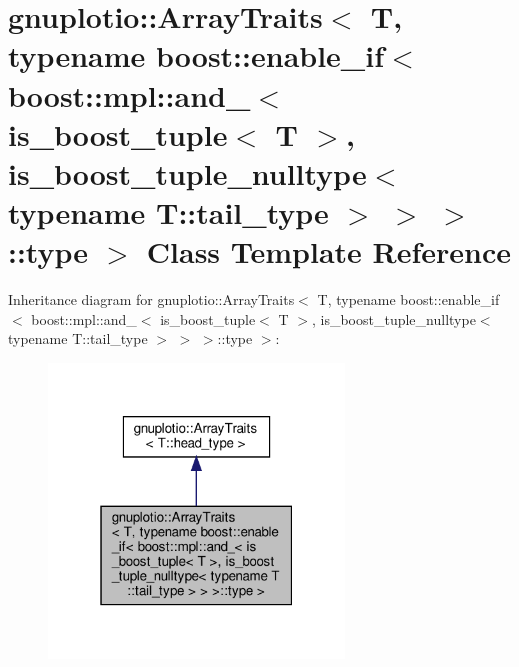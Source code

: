 \hypertarget{classgnuplotio_1_1ArrayTraits_3_01T_00_01typename_01boost_1_1enable__if_3_01boost_1_1mpl_1_1and_d5bfbd58f322d0a74d370034dff1881d}{}\section{gnuplotio\+:\+:Array\+Traits$<$ T, typename boost\+:\+:enable\+\_\+if$<$ boost\+:\+:mpl\+:\+:and\+\_\+$<$ is\+\_\+boost\+\_\+tuple$<$ T $>$, is\+\_\+boost\+\_\+tuple\+\_\+nulltype$<$ typename T\+:\+:tail\+\_\+type $>$ $>$ $>$\+:\+:type $>$ Class Template Reference}
\label{classgnuplotio_1_1ArrayTraits_3_01T_00_01typename_01boost_1_1enable__if_3_01boost_1_1mpl_1_1and_d5bfbd58f322d0a74d370034dff1881d}


Inheritance diagram for gnuplotio\+:\+:Array\+Traits$<$ T, typename boost\+:\+:enable\+\_\+if$<$ boost\+:\+:mpl\+:\+:and\+\_\+$<$ is\+\_\+boost\+\_\+tuple$<$ T $>$, is\+\_\+boost\+\_\+tuple\+\_\+nulltype$<$ typename T\+:\+:tail\+\_\+type $>$ $>$ $>$\+:\+:type $>$\+:
\nopagebreak
\begin{figure}[H]
\begin{center}
\leavevmode
\includegraphics[width=223pt]{classgnuplotio_1_1ArrayTraits_3_01T_00_01typename_01boost_1_1enable__if_3_01boost_1_1mpl_1_1and_aeaabfa162f172ea27fc7936200f6db1}
\end{center}
\end{figure}



